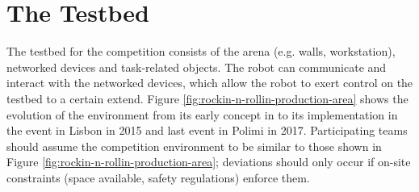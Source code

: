 \clearpage{}
\section{The \erlir Testbed}
\label{sec:TestBed}

The testbed for the \erlir competition consists of the arena (e.g. walls, workstation), networked devices and task-related objects. The robot can communicate and interact with the networked devices, which allow the robot to exert control on the testbed to a certain extend. 
Figure \ref{fig:rockin-n-rollin-production-area} shows the evolution of the \erlir environment from its early concept in \roaw to its implementation in the \roaw event in Lisbon in 2015 and \roaw last event in Polimi in 2017.
Participating teams should assume the competition environment to be similar to those shown in Figure \ref{fig:rockin-n-rollin-production-area}; deviations should only occur if on-site constraints (space available, safety regulations) enforce them.
%
